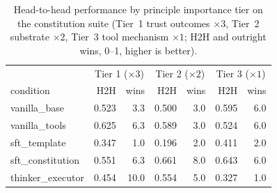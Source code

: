 \begin{table}[t]
  \centering
  \caption{Head-to-head performance by principle importance tier on the constitution suite (Tier~1 trust outcomes $\times 3$, Tier~2 substrate $\times 2$, Tier~3 tool mechanism $\times 1$; H2H and outright wins, 0--1, higher is better).}
  \label{tab:rank-tiers}
  \begin{tabular}{lrrrrrr}
    \toprule
    & \multicolumn{2}{c}{Tier 1 ($\times 3$)} & \multicolumn{2}{c}{Tier 2 ($\times 2$)} & \multicolumn{2}{c}{Tier 3 ($\times 1$)} \\
    condition & H2H & wins & H2H & wins & H2H & wins \\
    \midrule
    vanilla\_base & 0.523 & 3.3 & 0.500 & 3.0 & 0.595 & 6.0 \\
    vanilla\_tools & 0.625 & 6.3 & 0.589 & 3.0 & 0.524 & 6.0 \\
    sft\_template & 0.347 & 1.0 & 0.196 & 2.0 & 0.411 & 2.0 \\
    sft\_constitution & 0.551 & 6.3 & 0.661 & 8.0 & 0.643 & 6.0 \\
    thinker\_executor & 0.454 & 10.0 & 0.554 & 5.0 & 0.327 & 1.0 \\
    \bottomrule
  \end{tabular}
\end{table}
